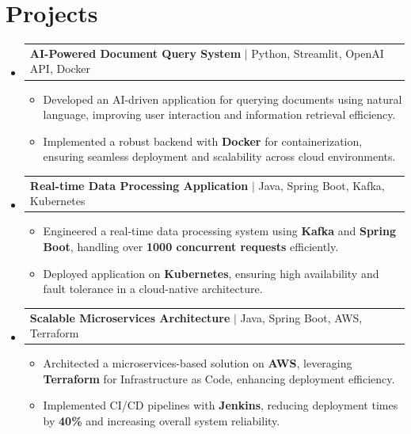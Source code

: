 \documentclass[letterpaper,11pt]{article}
\makeatletter
\newcommand{\resumeItem}[1]{
  \item\footnotesize{
    {#1 \vspace{-2pt}}
  }
}
\newcommand{\resumeProjectHeading}[2]{
    \item
    \begin{tabular*}{1.001\textwidth}{l@{\extracolsep{\fill}}r}
      \small#1 & \textbf{\small #2}\\
    \end{tabular*}\vspace{-7pt}
}
\newcommand{\resumeSubHeadingListStart}{\begin{itemize}[leftmargin=0pt, label={}]}
\newcommand{\resumeSubHeadingListEnd}{\end{itemize}}
\newcommand{\resumeItemListStart}{\begin{itemize}[leftmargin=*]}
\newcommand{\resumeItemListEnd}{\end{itemize}\vspace{-5pt}}
\makeatother
\begin{document}
\section{Projects}
    \vspace{-5pt}
    \resumeSubHeadingListStart

      \resumeProjectHeading
          {\textbf{AI-Powered Document Query System} $|$ Python, Streamlit, OpenAI API, Docker}{ }
        \resumeItemListStart
            \resumeItem{Developed an AI-driven application for querying documents using natural language, improving user interaction and information retrieval efficiency.}
            \resumeItem{Implemented a robust backend with \textbf{Docker} for containerization, ensuring seamless deployment and scalability across cloud environments.}
        \resumeItemListEnd
        \vspace{-12pt}

      \resumeProjectHeading
          {\textbf{Real-time Data Processing Application} $|$ Java, Spring Boot, Kafka, Kubernetes}{ }
        \resumeItemListStart
            \resumeItem{Engineered a real-time data processing system using \textbf{Kafka} and \textbf{Spring Boot}, handling over \textbf{1000 concurrent requests} efficiently.}
            \resumeItem{Deployed application on \textbf{Kubernetes}, ensuring high availability and fault tolerance in a cloud-native architecture.}
        \resumeItemListEnd
        \vspace{-12pt}

      \resumeProjectHeading
          {\textbf{Scalable Microservices Architecture} $|$ Java, Spring Boot, AWS, Terraform}{ }
        \resumeItemListStart
            \resumeItem{Architected a microservices-based solution on \textbf{AWS}, leveraging \textbf{Terraform} for Infrastructure as Code, enhancing deployment efficiency.}
            \resumeItem{Implemented CI/CD pipelines with \textbf{Jenkins}, reducing deployment times by \textbf{40\%} and increasing overall system reliability.}
        \resumeItemListEnd

    \resumeSubHeadingListEnd
\end{document}
